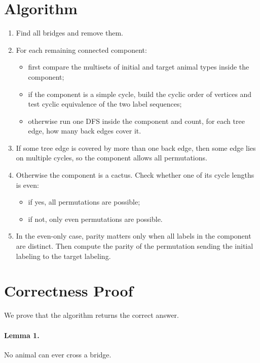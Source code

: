 \documentclass[11pt]{article}
\begin{document}
\section*{Algorithm}

\begin{enumerate}[leftmargin=*]
    \item Find all bridges and remove them.
    \item For each remaining connected component:
    \begin{itemize}[leftmargin=*]
        \item first compare the multisets of initial and target animal types inside the component;
        \item if the component is a simple cycle, build the cyclic order of vertices and test cyclic
        equivalence of the two label sequences;
        \item otherwise run one DFS inside the component and count, for each tree edge, how many back
        edges cover it.
    \end{itemize}
    \item If some tree edge is covered by more than one back edge, then some edge lies on multiple cycles,
    so the component allows all permutations.
    \item Otherwise the component is a cactus. Check whether one of its cycle lengths is even:
    \begin{itemize}[leftmargin=*]
        \item if yes, all permutations are possible;
        \item if not, only even permutations are possible.
    \end{itemize}
    \item In the even-only case, parity matters only when all labels in the component are distinct. Then
    compute the parity of the permutation sending the initial labeling to the target labeling.
\end{enumerate}

\section*{Correctness Proof}

We prove that the algorithm returns the correct answer.

\paragraph{Lemma 1.}
No animal can ever cross a bridge.
\end{document}
